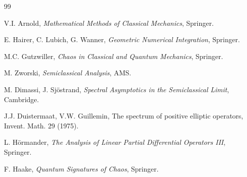 \documentclass{book}
\begin{document}
\begin{thebibliography}{99}

V.I. Arnold,
\textit{Mathematical Methods of Classical Mechanics},
Springer.

E. Hairer, C. Lubich, G. Wanner,
\textit{Geometric Numerical Integration},
Springer.

M.C. Gutzwiller,
\textit{Chaos in Classical and Quantum Mechanics},
Springer.

M. Zworski,
\textit{Semiclassical Analysis},
AMS.

M. Dimassi, J. Sj\"ostrand,
\textit{Spectral Asymptotics in the Semiclassical Limit},
Cambridge.

J.J. Duistermaat, V.W. Guillemin,
The spectrum of positive elliptic operators,
Invent. Math. 29 (1975).

L. H\"ormander,
\textit{The Analysis of Linear Partial Differential Operators III},
Springer.

F. Haake,
\textit{Quantum Signatures of Chaos},
Springer.

\end{thebibliography}

\printindex
\end{document}

